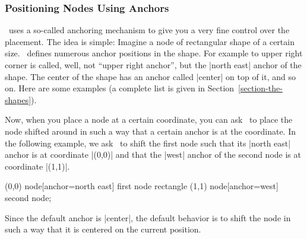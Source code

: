 \subsubsection{Positioning Nodes Using Anchors}

\pgfname\ uses a so-called anchoring mechanism to give you a very fine control
over the placement. The idea is simple: Imagine a node of rectangular shape of
a certain size. \pgfname\ defines numerous anchor positions in the shape. For
example to upper right corner is called, well, not ``upper right anchor'', but
the |north east| anchor of the shape. The center of the shape has an anchor
called |center| on top of it, and so on. Here are some examples (a complete
list is given in Section~\ref{section-the-shapes}).

\medskip\noindent
{}

Now, when you place a node at a certain coordinate, you can ask \tikzname\ to
place the node shifted around in such a way that a certain anchor is at the
coordinate. In the following example, we ask \tikzname\ to shift the first node
such that its  |north east| anchor is at coordinate |(0,0)| and that the |west|
anchor of the second node is at coordinate |(1,1)|.
%
\begin{codeexample}[]
\tikz \draw           (0,0) node[anchor=north east] {first node}
            rectangle (1,1) node[anchor=west] {second node};
\end{codeexample}

Since the default anchor is |center|, the default behavior is to shift the node
in such a way that it is centered on the current position.

